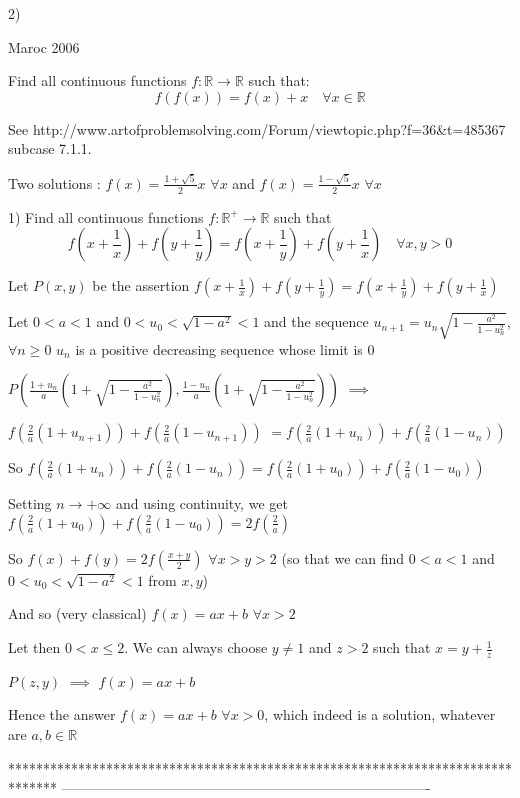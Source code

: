 \begin{solution}
	\begin{tcolorbox}2) \begin{bolded}Maroc 2006 \end{bolded}
Find all continuous functions $f: \mathbb R\to\mathbb R$  such that:
\[f (f (x)) = f (x) + x \quad \forall x\in\mathbb R\]\end{tcolorbox}
See http://www.artofproblemsolving.com/Forum/viewtopic.php?f=36&t=485367 subcase 7.1.1.

Two solutions : $\boxed{f(x)=\frac{1+\sqrt 5}2x}$ $\forall x$ and $\boxed{f(x)=\frac{1-\sqrt 5}2x}$ $\forall x$
\end{solution}



\begin{solution}
	\begin{tcolorbox}1) Find all continuous functions $f: \mathbb {R}^{+}\to\mathbb R$ such that 
\[f \left(x +\frac{1 }{x}\right) + f \left(y+\frac{1}{ y}\right) = f \left(x+\frac{1 }{ y}\right) + f \left(y+\frac{1 }{ x}\right)\quad \forall x, y> 0\]\end{tcolorbox}
Let $P(x,y)$ be the assertion $f(x+\frac 1x)+f(y+\frac 1y)=f(x+\frac 1y)+f(y+\frac 1x)$

Let $0<a<1$ and $0<u_0<\sqrt{1-a^2}<1$ and the sequence $u_{n+1}=u_n\sqrt{1-\frac{a^2}{1-u_n^2}}$,$\forall n\ge 0$
$u_n$ is a positive decreasing sequence whose limit is $0$

$P\left(\frac{1+u_n}a\left(1+\sqrt{1-\frac{a^2}{1-u_n^2}}\right), \frac{1-u_n}a\left(1+\sqrt{1-\frac{a^2}{1-u_n^2}}\right)\right)$ $\implies$

$f(\frac 2a(1+u_{n+1}))+f(\frac 2a(1-u_{n+1}))$ $=f(\frac 2a(1+u_n))+f(\frac 2a(1-u_n))$

So $f(\frac 2a(1+u_n))+f(\frac 2a(1-u_n))=f(\frac 2a(1+u_0))+f(\frac 2a(1-u_0))$

Setting $n\to +\infty$ and using continuity, we get $f(\frac 2a(1+u_0))+f(\frac 2a(1-u_0))=2f(\frac 2a)$

So $f(x)+f(y)=2f(\frac{x+y}2)$ $\forall x>y>2$ (so that we can find $0<a<1$ and $0<u_0<\sqrt{1-a^2}<1$ from $x,y$)

And so (very classical) $f(x)=ax+b$ $\forall x>2$

Let then $0<x\le 2$. We can always choose $y\ne 1$ and $z>2$ such that $x=y+\frac 1z$

$P(z,y)$ $\implies$ $f(x)=ax+b$

Hence the answer $\boxed{f(x)=ax+b}$ $\forall x>0$, which indeed is a solution, whatever are $a,b\in\mathbb R$
\end{solution}
*******************************************************************************
-------------------------------------------------------------------------------


